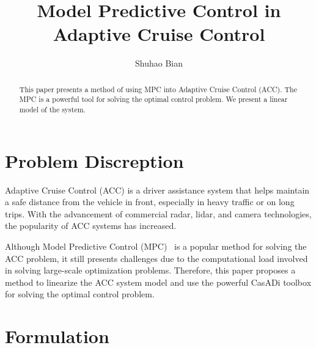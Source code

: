 \documentclass{article}
\title{Model Predictive Control in Adaptive Cruise Control}
\author{Shuhao Bian}
\numberwithin{equation}{section}
\begin{document}
\maketitle

\begin{abstract}
    This paper presents a method of using MPC into Adaptive Cruise Control (ACC).
    The MPC is a powerful tool for solving the optimal control problem.
    We present a linear model of the system. %
\end{abstract}

\section{Problem Discreption}


Adaptive Cruise Control (ACC) is a driver assistance system that helps maintain
a safe distance from the vehicle in front, especially in heavy traffic or on
long trips. With the advancement of commercial radar, lidar, and camera
technologies, the popularity of ACC systems has increased.

Although Model Predictive Control (MPC)~\cite{rawlings2012postface} is a
popular method for solving the ACC problem, it still presents challenges due to
the computational load involved in solving large-scale optimization problems.
Therefore, this paper proposes a method to linearize the ACC system model and
use the powerful CasADi toolbox\cite{Andersson2018} for solving the optimal
control problem.

\section{Formulation}
\end{document}
